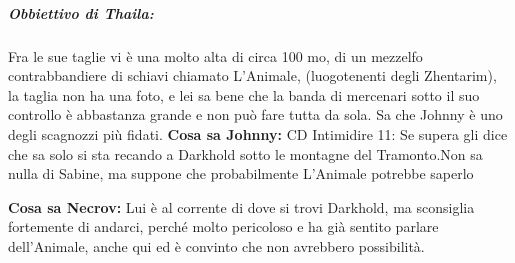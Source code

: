 \documentclass{article}
\begin{document}
           
            
            \subparagraph{Obbiettivo di Thaila: } Fra le sue taglie vi è una molto alta di circa 100 mo, di un mezzelfo contrabbandiere di schiavi chiamato L'Animale, (luogotenenti degli Zhentarim), la taglia non ha una foto, e lei sa bene che la banda di mercenari sotto il suo controllo è abbastanza grande e non può fare tutta da sola. Sa che Johnny è uno degli scagnozzi più fidati. 
                \textbf{Cosa sa Johnny: } CD Intimidire 11: Se supera gli dice che sa solo si sta recando a Darkhold sotto le montagne del Tramonto.Non sa nulla di Sabine, ma suppone che probabilmente L'Animale potrebbe saperlo

                \textbf{Cosa sa Necrov: } Lui è al corrente di dove si trovi Darkhold, ma sconsiglia fortemente di andarci, perché molto pericoloso e ha già sentito parlare dell'Animale, anche qui ed è convinto che non avrebbero possibilità. 
\end{document}
